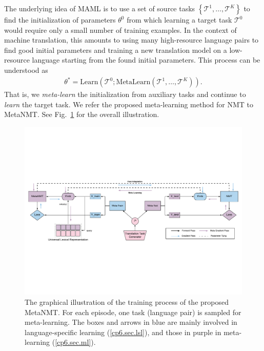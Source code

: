 The underlying idea of MAML is to use a set of source tasks $\left\{ \mathcal{T}^1, \ldots, \mathcal{T}^K \right\}$ to find the initialization of parameters $\theta^0$ from which learning a target task $\mathcal{T}^0$ would require only a small number of training examples. In the context of machine translation, this amounts to using many high-resource language pairs to find good initial parameters and training a new translation model on a low-resource language starting from the found initial parameters. This process can be understood as 
\begin{align}
\theta^* = \text{Learn}(\mathcal{T}^0; \text{MetaLearn}(\mathcal{T}^1, \ldots, \mathcal{T}^K)).
\end{align}
That is, we {\it meta-learn} the initialization from auxiliary tasks and continue to {\it learn} the target task. We refer the proposed meta-learning method for NMT to MetaNMT.
See Fig.~\ref{cp6.fig.framework} for the overall illustration. 
\begin{figure}
    \centering
    \includegraphics[width=\linewidth]{figs/meta/framework.pdf}
    \caption{The graphical illustration of the training process of the proposed MetaNMT. For each episode, one task (language pair) is sampled for meta-learning. The boxes and arrows in blue are mainly involved in language-specific learning (\textsection\ref{cp6.sec.lsl}), and those in purple in meta-learning (\textsection\ref{cp6.sec.ml}).}
    \label{cp6.fig.framework}
\end{figure}


